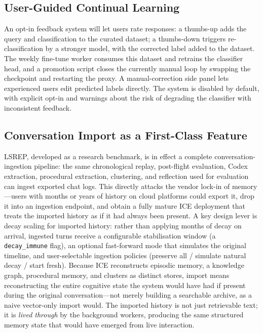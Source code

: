 \documentclass[10pt]{article}
\begin{document}
\subsection{User-Guided Continual Learning}
An opt-in feedback system will let users rate responses: a thumbs-up adds the query and classification to the curated dataset; a thumbs-down triggers re-classification by a stronger model, with the corrected label added to the dataset. The weekly fine-tune worker consumes this dataset and retrains the classifier head, and a promotion script closes the currently manual loop by swapping the checkpoint and restarting the proxy. A manual-correction side panel lets experienced users edit predicted labels directly. The system is disabled by default, with explicit opt-in and warnings about the risk of degrading the classifier with inconsistent feedback.

\subsection{Conversation Import as a First-Class Feature}
LSREP, developed as a research benchmark, is in effect a complete conversation-ingestion pipeline: the same chronological replay, post-flight evaluation, Codex extraction, procedural extraction, clustering, and reflection used for evaluation can ingest exported chat logs. This directly attacks the vendor lock-in of memory---users with months or years of history on cloud platforms could export it, drop it into an ingestion endpoint, and obtain a fully mature ICE deployment that treats the imported history as if it had always been present. A key design lever is decay scaling for imported history: rather than applying months of decay on arrival, ingested turns receive a configurable stabilisation window (a \texttt{decay\_immune} flag), an optional fast-forward mode that simulates the original timeline, and user-selectable ingestion policies (preserve all / simulate natural decay / start fresh). Because ICE reconstructs episodic memory, a knowledge graph, procedural memory, and clusters as distinct stores, import means reconstructing the entire cognitive state the system would have had if present during the original conversation---not merely building a searchable archive, as a naive vector-only import would. The imported history is not just retrievable text; it is \emph{lived through} by the background workers, producing the same structured memory state that would have emerged from live interaction.

\end{document}
